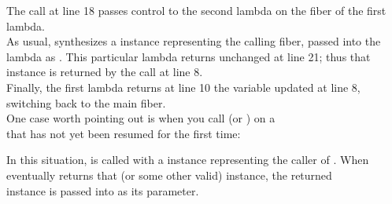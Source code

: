 
The  call at line 18 passes control to the second
lambda on the fiber of the first lambda.\\

As usual, \resumewith synthesizes a \fiber instance representing the calling
fiber, passed into the lambda as . This particular lambda returns 
unchanged at line 21; thus that  instance is returned by the \resume call
at line 8.\\

Finally, the first lambda returns at line 10 the  variable updated at
line 8, switching back to the main fiber.\\

One case worth pointing out is when you call \resumewith (or \xtresumewith) on
a\\
\fiber that has not yet been resumed for the first time:

In this situation,  is called with a \fiber instance
representing the caller of \resumewith. When  eventually
returns that (or some other valid) \fiber instance, the returned\\
\fiber instance is passed into  as its  parameter.

